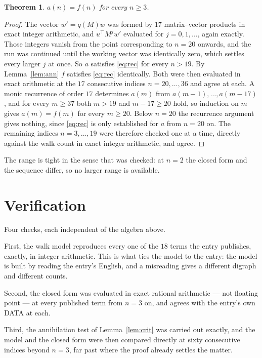 \documentclass[11pt,a4paper]{article}
\theoremstyle{plain}
\newtheorem{theorem}{Theorem}
\theoremstyle{definition}
\begin{document}
\begin{theorem}
$a(n)=f(n)$ for every $n\ge3$.
\end{theorem}

\begin{proof}
The vector $w'=q(M)w$ was formed by $17$ matrix--vector products in exact integer
arithmetic, and $u^{\!\top}M^{j}w'$ evaluated for $j=0,1,\dots$, again exactly. Those integers
vanish from the point corresponding to $n=20$ onwards, and the run was continued until the
working vector was identically zero, which settles every larger $j$ at once. So $a$ satisfies
\eqref{eq:rec} for every $n>19$. By Lemma~\ref{lem:ann} $f$ satisfies \eqref{eq:rec}
identically. Both were then evaluated in exact arithmetic at the $17$ consecutive indices
$n=20,\dots,36$ and agree at each. A monic recurrence of order $17$
determines $a(m)$ from $a(m-1),\dots,a(m-17)$, and for every $m\ge37$ both
$m>19$ and $m-17\ge20$ hold, so induction on $m$ gives $a(m)=f(m)$ for every
$m\ge20$.
Below $n=20$ the recurrence argument gives nothing, since \eqref{eq:rec} is only
established for $a$ from $n=20$ on. The remaining indices $n=3,\dots,19$ were
therefore checked one at a time, directly against the walk count in exact integer arithmetic,
and agree.
\end{proof}

The range is tight in the sense that was checked: at $n=2$ the closed form and the sequence differ, so no larger range is available.

\section{Verification}

Four checks, each independent of the algebra above.

First, the walk model reproduces every one of the $18$ terms the entry publishes,
exactly, in integer arithmetic. This is what ties the model to the entry: the model is built
by reading the entry's English, and a misreading gives a different digraph and different
counts.

Second, the closed form was evaluated in exact rational arithmetic --- not floating point ---
at every published term from $n=3$ on, and agrees with the entry's own DATA at each.

Third, the annihilation test of Lemma~\ref{lem:crit} was carried out exactly, and the model
and the closed form were then compared directly at sixty consecutive indices beyond
$n=3$, far past where the proof already settles the matter.
\end{document}

